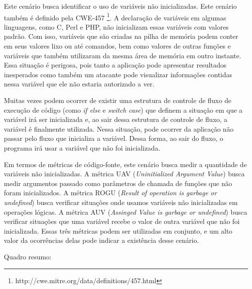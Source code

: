 Este cenário busca identificar o uso de variáveis não inicializadas. Este cenário também é definido pela CWE-457 \footnote{http://cwe.mitre.org/data/definitions/457.html}.
%
A declaração de variáveis em algumas linguagens, como C, Perl e PHP, não inicializam essas variáveis com valores padrão. Com isso, variáveis que são criadas na pilha de memória podem conter em seus valores lixo ou até comandos, bem como valores de outras funções e variáveis que também utilizaram da mesma área de memória em outro instante.
%
Essa situação é perigosa, pois tanto a aplicação pode apresentar resultados inesperados como também um atacante pode visualizar informações contidas nessa variável que ele não estaria autorizado a ver. 

Muitas vezes podem ocorrer de existir uma estrutura de controle de fluxo de execução de código (como \emph{if else} e \emph{switch case}) que definem a situação em que a variável irá ser inicializada e, ao sair dessa estrutura de controle de fluxo, a variável é finalmente utilizada. Nessa situação, pode ocorrer da aplicação não passar pelo fluxo que inicializa a variável. Dessa forma, ao sair do fluxo, o programa irá usar a variável que não foi inicializada.

Em termos de métricas de código-fonte, este cenário busca medir a quantidade de variáveis não inicializadas. A métrica UAV (\emph{Uninitialized Argument Value}) busca medir argumentos passado como parâmetros de chamada de funções que não foram inicializados. A métrica ROGU (\emph{Result of operation is garbage or undefined}) busca verificar situações onde usamos variáveis não inicializadas em operações lógicas. A métrica AUV (\emph{Assinged Value is garbage or undefined}) busca verificar situações que uma variável recebe o valor de outra variável que não foi inicializada. Essas três métricas podem ser utilizadas em conjunto, e um alto valor da ocorrências delas pode indicar a existência desse cenário.

Quadro resumo:

